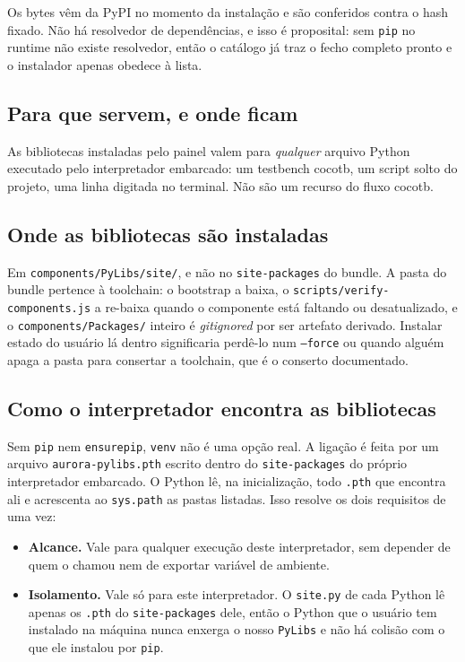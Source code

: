 \documentclass[11pt,a4paper]{article}
\begin{document}
Os bytes vêm da PyPI no momento da instalação e são conferidos contra o hash
fixado. Não há resolvedor de dependências, e isso é proposital: sem \texttt{pip}
no runtime não existe resolvedor, então o catálogo já traz o fecho completo
pronto e o instalador apenas obedece à lista.

\subsection{Para que servem, e onde ficam}

As bibliotecas instaladas pelo painel valem para \emph{qualquer} arquivo Python
executado pelo interpretador embarcado: um testbench cocotb, um script solto do
projeto, uma linha digitada no terminal. Não são um recurso do fluxo cocotb.

\subsection{Onde as bibliotecas são instaladas}

Em \texttt{components/PyLibs/site/}, e não no \texttt{site-packages} do bundle.
A pasta do bundle pertence à toolchain: o bootstrap a baixa, o
\texttt{scripts/verify-components.js} a re-baixa quando o componente está
faltando ou desatualizado, e o \texttt{components/Packages/} inteiro é
\emph{gitignored} por ser artefato derivado. Instalar estado do usuário lá dentro
significaria perdê-lo num \texttt{--force} ou quando alguém apaga a pasta para
consertar a toolchain, que é o conserto documentado.

\subsection{Como o interpretador encontra as bibliotecas}

Sem \texttt{pip} nem \texttt{ensurepip}, \texttt{venv} não é uma opção real. A
ligação é feita por um arquivo \texttt{aurora-pylibs.pth} escrito dentro do
\texttt{site-packages} do próprio interpretador embarcado. O Python lê, na
inicialização, todo \texttt{.pth} que encontra ali e acrescenta ao
\texttt{sys.path} as pastas listadas. Isso resolve os dois requisitos de uma vez:

\begin{itemize}
  \item \textbf{Alcance.} Vale para qualquer execução deste interpretador, sem
        depender de quem o chamou nem de exportar variável de ambiente.
  \item \textbf{Isolamento.} Vale só para este interpretador. O \texttt{site.py}
        de cada Python lê apenas os \texttt{.pth} do \texttt{site-packages} dele,
        então o Python que o usuário tem instalado na máquina nunca enxerga o
        nosso \texttt{PyLibs} e não há colisão com o que ele instalou por
        \texttt{pip}.
\end{itemize}
\end{document}

